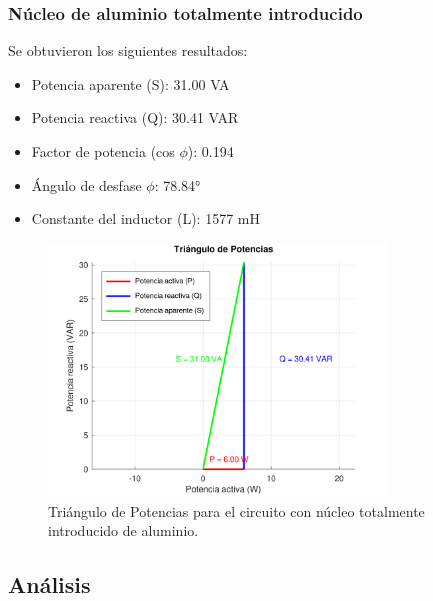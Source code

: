 \documentclass{article}
\begin{document}
                    \subsubsection{Núcleo de aluminio totalmente introducido}

                            Se obtuvieron los siguientes resultados:
                        \begin{itemize}
                            \item Potencia aparente (S): 31.00 VA
                            \item Potencia reactiva (Q): 30.41 VAR
                            \item Factor de potencia (cos $\phi$): 0.194
                            \item Ángulo de desfase $\phi$: 78.84°
                            \item Constante del inductor (L): 1577 mH
                        \end{itemize}

                        \begin{figure}[H]
                            \centering
                            \includegraphics[width=0.8\textwidth]{graficoTotalAluminio.png}
                            \caption{Triángulo de Potencias para el circuito con núcleo totalmente introducido de aluminio.}
                            \label{fig:graficoTotalAluminio}
                        \end{figure}
            
                        
        \subsection{Análisis}
        
\end{document}
